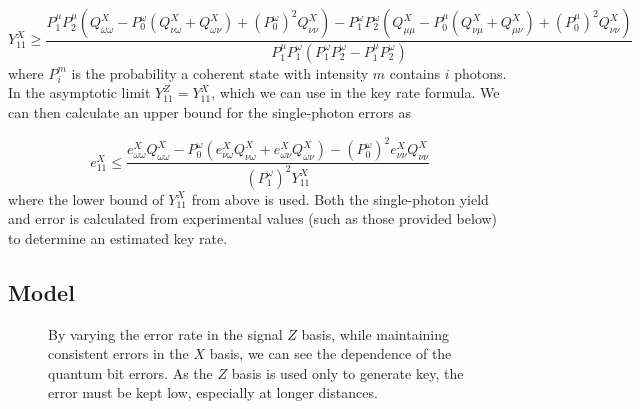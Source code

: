 \begin{equation}
	Y^X_{11} \ge \frac{P^\mu_1 P^\mu_2 (Q_{\omega\omega}^{X} - P^\omega_0 ( Q_{\nu\omega}^X + Q_{\omega\nu}^X) + (P^\omega_0)^2 Q_{\nu\nu}^X) - P^\omega_1 P^\omega_2(Q_{\mu\mu}^{X} - P^\mu_0 ( Q_{\nu\mu}^X + Q_{\mu\nu}^X) + (P^\mu_0)^2 Q_{\nu\nu}^X)}{P^\mu_1 P^\omega_1 ( P^\omega_1  P^\omega_2 - P^\mu_1 P^\omega_2)}
\end{equation}
where $P_i^m$ is the probability a coherent state with intensity $m$ contains $i$ photons. In the asymptotic limit $Y^Z_{11} =  Y^X_{11}$, which we can use in the key rate formula. We can then calculate an upper bound for the single-photon errors as 

\begin{equation}
	e^X_{11} \le \frac{e^X_{\omega\omega}Q^X_{\omega\omega} - P^\omega_0\left(e^X_{\nu\omega}Q^X_{\nu\omega} + e^X_{\omega\nu}Q^X_{\omega\nu}\right) - (P^\omega_0)^2e^X_{\nu\nu}Q^X_{\nu\nu}}{(P^\omega_1)^2 Y^X_{11}}
\end{equation}
where the lower bound of $Y^X_{11}$ from above is used. Both the single-photon yield and error is calculated from experimental values (such as those provided below) to determine an estimated key rate.



\subsection{Model}

\begin{figure}[tbp]
	\caption[Error dependence of secret key rate]{By varying the error rate in the signal $Z$ basis, while maintaining consistent errors in the $X$ basis, we can see the dependence of the quantum bit errors. As the $Z$ basis is used only to generate key, the error must be kept low, especially at longer distances.}
	\label{fig:skr_error_dependence}
\end{figure}

